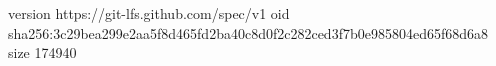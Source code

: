 version https://git-lfs.github.com/spec/v1
oid sha256:3c29bea299e2aa5f8d465fd2ba40c8d0f2c282ced3f7b0e985804ed65f68d6a8
size 174940
